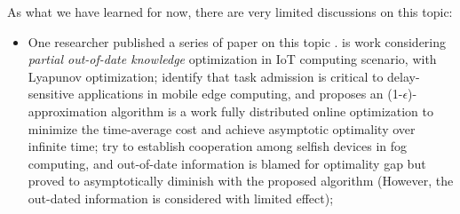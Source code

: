 {    As what we have learned for now, there are very limited discussions on this topic:
    \begin{itemize}
        \item One researcher published a series of paper on this topic \cite{Lyu2017,Lyu2018,Lyu2018a,Lyu2018b}.
            \cite{Lyu2017} is work considering \emph{partial out-of-date knowledge} optimization in IoT computing scenario, with Lyapunov optimization;
             \cite{Lyu2018} identify that task admission is critical to delay-sensitive applications in mobile edge computing, and proposes an (1-$\epsilon$)-approximation algorithm
             \cite{Lyu2018a} is a work fully distributed online optimization to minimize the time-average cost and achieve asymptotic optimality over infinite time;
            \cite{Lyu2018b} try to establish cooperation among selfish devices in fog computing, and out-of-date information is blamed for optimality gap but proved to asymptotically diminish with the proposed algorithm (However, the out-dated information is considered with limited effect);
    \end{itemize}
}


